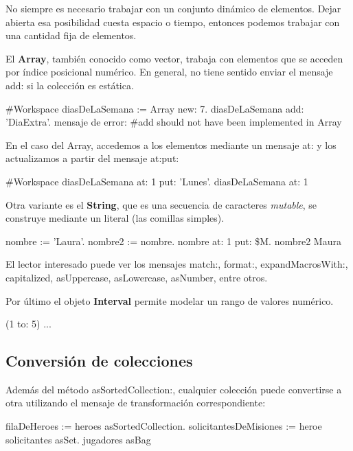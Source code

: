 \documentclass[a4paper,12pt]{book}
\begin{document}
No siempre es necesario trabajar con un conjunto dinámico de elementos. Dejar abierta esa posibilidad cuesta
espacio o tiempo, entonces podemos trabajar con una cantidad fija de elementos.

El \textbf{Array}, también conocido como vector, trabaja con elementos que se acceden por índice posicional
numérico.
\newline
\newline
En general, no tiene sentido enviar el mensaje add: si la colección es estática.

\begin{code}
#Workspace
diasDeLaSemana := Array new: 7.
diasDeLaSemana add: 'DiaExtra'.   
{mensaje de error: #add should not have been implemented in Array}
\end{code}

En el caso del Array, accedemos a los elementos mediante un mensaje at: y los actualizamos a partir del mensaje
at:put:

\begin{code}
#Workspace
diasDeLaSemana at: 1 put: 'Lunes'.
diasDeLaSemana at: 1
\end{code}

Otra variante es el \textbf{String}, que es una secuencia de caracteres \textit{mutable}, se construye
mediante un literal (las comillas simples).

\begin{code}
nombre := 'Laura'.
nombre2 := nombre.
nombre at: 1 put: \$M.
nombre2
    Maura
\end{code}

El lector interesado puede ver los mensajes match:, format:, expandMacrosWith:, capitalized, asUppercase,
asLowercase, asNumber, entre otros.

Por último el objeto \textbf{Interval} permite modelar un rango de valores numérico.

\begin{code}
(1 to: 5) ...
\end{code}

\subsection{Conversión de colecciones}

Además del método asSortedCollection:, cualquier colección puede convertirse a otra utilizando el mensaje
de transformación correspondiente:

\begin{code}
filaDeHeroes := heroes asSortedCollection.
solicitantesDeMisiones := heroe solicitantes asSet.
jugadores asBag
\end{code}
\end{document}
